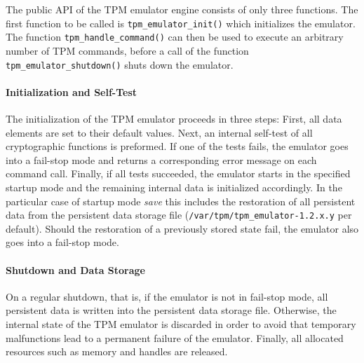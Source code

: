 \documentclass[runningheads]{llncs}
\newcommand{\file}[1]{\small\texttt{#1}\normalsize}
\newcommand{\func}[1]{\small\texttt{#1}\normalsize}
\begin{document}
The public API of the TPM emulator engine consists of only three functions.
The first function to be called is \func{tpm\_emulator\_init()} which
initializes the emulator. The function \func{tpm\_\-handle\_\-command()} can
then be used to execute an arbitrary number of TPM commands, before a call of
the function \func{tpm\_emulator\_shutdown()} shuts down the emulator.

\paragraph{Initialization and Self-Test}
The initialization of the TPM emulator proceeds in three steps:
First, all data elements are set to their default values. %
Next, an internal self-test of all cryptographic functions
is preformed. If one of the tests fails, the emulator goes into a fail-stop mode and returns
a corresponding error message on each command call. Finally, if all tests succeeded, the emulator
starts in the specified startup mode and the remaining internal data is initialized accordingly.
In the particular case of startup mode \emph{save} this includes the restoration of all persistent
data from the persistent data storage file (\file{/var/tpm/tpm\_emulator-1.2.x.y} per default).
Should the restoration of a previously stored state fail, the emulator also goes into a fail-stop
mode.

\paragraph{Shutdown and Data Storage}
On a regular shutdown, that is, if the emulator is not in fail-stop mode, all persistent data is
written into the persistent data storage file. Otherwise, the internal state of the TPM emulator
is discarded in order to avoid that temporary malfunctions lead to a permanent failure of the
emulator. Finally, all allocated resources such as memory and handles are released.
\end{document}
